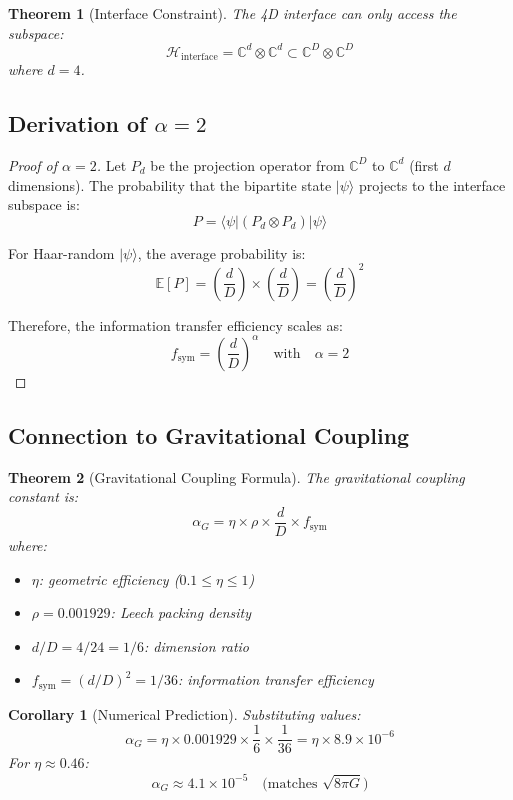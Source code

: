 \documentclass[11pt]{article}
\newtheorem{theorem}{Theorem}
\newtheorem{corollary}{Corollary}
\begin{document}
\begin{theorem}[Interface Constraint]
The 4D interface can only access the subspace:
\[
\mathcal{H}_{\text{interface}} = \mathbb{C}^d \otimes \mathbb{C}^d \subset \mathbb{C}^D \otimes \mathbb{C}^D
\]
where $d=4$.
\end{theorem}

\subsection{Derivation of $\alpha=2$}

\begin{proof}[Proof of $\alpha=2$]
Let $P_d$ be the projection operator from $\mathbb{C}^D$ to $\mathbb{C}^d$ (first $d$ dimensions). The probability that the bipartite state $|\psi\rangle$ projects to the interface subspace is:
\[
P = \langle \psi | (P_d \otimes P_d) | \psi \rangle
\]

For Haar-random $|\psi\rangle$, the average probability is:
\[
\mathbb{E}[P] = \left(\frac{d}{D}\right) \times \left(\frac{d}{D}\right) = \left(\frac{d}{D}\right)^2
\]

Therefore, the information transfer efficiency scales as:
\[
f_{\text{sym}} = \left(\frac{d}{D}\right)^\alpha \quad \text{with} \quad \alpha = 2
\]
\end{proof}

\subsection{Connection to Gravitational Coupling}

\begin{theorem}[Gravitational Coupling Formula]
The gravitational coupling constant is:
\[
\alpha_G = \eta \times \rho \times \frac{d}{D} \times f_{\text{sym}}
\]
where:
\begin{itemize}
\item $\eta$: geometric efficiency ($0.1 \leq \eta \leq 1$)
\item $\rho = 0.001929$: Leech packing density
\item $d/D = 4/24 = 1/6$: dimension ratio
\item $f_{\text{sym}} = (d/D)^2 = 1/36$: information transfer efficiency
\end{itemize}
\end{theorem}

\begin{corollary}[Numerical Prediction]
Substituting values:
\[
\alpha_G = \eta \times 0.001929 \times \frac{1}{6} \times \frac{1}{36} = \eta \times 8.9\times10^{-6}
\]
For $\eta \approx 0.46$:
\[
\alpha_G \approx 4.1\times10^{-5} \quad \text{(matches $\sqrt{8\pi G}$)}
\]
\end{corollary}
\end{document}
